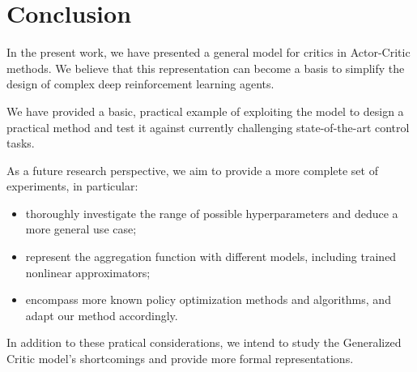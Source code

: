 \section{Conclusion}
\label{sec:conc}
In the present work, we have presented a general model for critics in Actor-Critic methods. We believe that this representation can become a basis to simplify the design of complex deep reinforcement learning agents.

We have provided a basic, practical example of exploiting the model to design a practical method and test it against currently challenging state-of-the-art control tasks.

As a future research perspective, we aim to provide a more complete set of experiments, in particular: 
\begin{itemize}
\item thoroughly investigate the range of possible hyperparameters and deduce a more general use case;
\item represent the aggregation function with different models, including trained nonlinear approximators;
\item encompass more known policy optimization methods and algorithms, and adapt our method accordingly.
\end{itemize}

In addition to these pratical considerations, we intend to study the Generalized Critic model's shortcomings and provide more formal representations.



